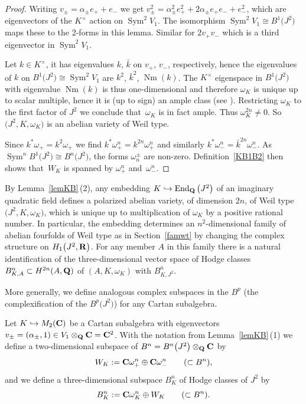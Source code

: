 \documentclass[pdftex]{sigma}
\numberwithin{equation}{section}
\begin{document}
\begin{proof}Writing $v_\pm=\alpha_\pm e_++e_-$ we get $v_\pm^2=\alpha_\pm^2e_+^2+2\alpha_\pm e_+e_-+e_-^2$,
which are eigenvectors of the $K^\times$ action on $\operatorname{Sym}^2V_1$.
The isomorphism $\operatorname{Sym}^2V_1\cong B^1\big(J^2\big)$ maps these to the 2-forms in this lemma. Similar for
$2v_+v_-$ which is a third eigenvector in $\operatorname{Sym}^2V_1$.

Let $k\in K^\times$, it has eigenvalues $k$, $\bar{k}$ on $v_+$, $v_-$, respectively,
hence the eigenvalues of $k$ on $B^1\big(J^2\big)\cong \operatorname{Sym}^2V_1$ are $k^2$, $\bar{k}^2$, $\operatorname{Nm}(k)$.
The $K^\times$ eigenspace in $B^1\big(J^2\big)$ with eigenvalue $\operatorname{Nm}(k)$ is thus one-dimensional
and therefore $\omega_K$ is unique up to scalar multiple, hence
it is (up to sign) an ample class (see \cite[Lemma~5.2]{vG}).
Restricting $\omega_K$ to the first factor of $J^2$ we conclude that~$\omega_K$ is in fact ample.
Thus $\omega_K^{2n}\neq 0$. So $\big(J^2,K,\omega_K\big)$
is an abelian variety of Weil type.

Since $k^*\omega_+ = k^{2}\omega_+$ we find
$k^*\omega^n_+=k^{2n}\omega_+^n$ and similarly
$k^*\omega^n_-=\bar{k}^{2n}\omega_-^n$.
As $\operatorname{Sym}^nB^1\big(J^2\big)\cong B^n\big(J^2\big)$, the forms $\omega_n^\pm$ are non-zero.
Definition~\ref{KB1B2} then shows that~$W_K$
is spanned by $\omega_+^{n}$ and~$\omega_-^n$.
\end{proof}

By Lemma~\ref{lemKB}\,(2),
any embedding $K\hookrightarrow \operatorname{End}_{\bf Q}\big(J^2\big)$ of an imaginary quadratic field
defines a polarized abelian variety, of dimension $2n$, of Weil type $\big(J^2,K,\omega_K\big)$,
which is unique up to multiplication of $\omega_K$ by a positive rational number.
In particular, the embedding determines an $n^2$-dimensional
family of abelian fourfolds of Weil type as in Section~\ref{famwt}
by changing the complex structure on $H_1\big(J^2,{\bf R}\big)$.
For any member $A$ in this family there is a natural identification of the
three-dimensional vector space of Hodge classes $B^n_{K,A}\subset H^{2n}(A,{\bf Q})$ of $(A,K,\omega_K)$
with $B^n_{K,J^2}$.

More generally, we define analogous complex subspaces in the $B^p$ (the complexification
of the $B^p\big(J^2\big)$) for any Cartan subalgebra.

\begin{Definition} \label{defBpK}
Let $K\hookrightarrow M_2({\bf C})$
be a Cartan subalgebra with eigenvectors $v_\pm=(\alpha_\pm,1) \in V_1\otimes_{\bf Q}{\bf C}={\bf C}^2$.
With the notation from Lemma~\ref{lemKB}\,(1)
we define a two-dimensional subspace of $B^n=B^n\big(J^2\big)\otimes_{\bf Q}{\bf C}$ by
\[
W_K := {\bf C} \omega_+^n \oplus {\bf C} \omega_-^n\qquad (\subset B^n),
\]
and we define a three-dimensional subspace $B^n_K$ of Hodge classes of $J^2$ by
\[
B^n_K := {\bf C}\omega_K^n \oplus W_K\qquad (\subset B^n).
\]
\end{Definition}
\end{document}
